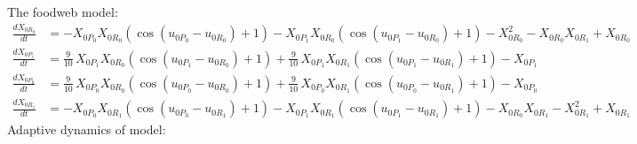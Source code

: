 \documentclass{article}
\begin{document}
The foodweb model:
\[\begin{align*}
\frac{dX_{0R_{0}}}{dt} &= -X_{0P_{0}} X_{0R_{0}} {\left(\cos\left(u_{0P_{0}} - u_{0R_{0}}\right) + 1\right)} - X_{0P_{1}} X_{0R_{0}} {\left(\cos\left(u_{0P_{1}} - u_{0R_{0}}\right) + 1\right)} - X_{0R_{0}}^{2} - X_{0R_{0}} X_{0R_{1}} + X_{0R_{0}}\\
\frac{dX_{0P_{1}}}{dt} &= \frac{9}{10} \, X_{0P_{1}} X_{0R_{0}} {\left(\cos\left(u_{0P_{1}} - u_{0R_{0}}\right) + 1\right)} + \frac{9}{10} \, X_{0P_{1}} X_{0R_{1}} {\left(\cos\left(u_{0P_{1}} - u_{0R_{1}}\right) + 1\right)} - X_{0P_{1}}\\
\frac{dX_{0P_{0}}}{dt} &= \frac{9}{10} \, X_{0P_{0}} X_{0R_{0}} {\left(\cos\left(u_{0P_{0}} - u_{0R_{0}}\right) + 1\right)} + \frac{9}{10} \, X_{0P_{0}} X_{0R_{1}} {\left(\cos\left(u_{0P_{0}} - u_{0R_{1}}\right) + 1\right)} - X_{0P_{0}}\\
\frac{dX_{0R_{1}}}{dt} &= -X_{0P_{0}} X_{0R_{1}} {\left(\cos\left(u_{0P_{0}} - u_{0R_{1}}\right) + 1\right)} - X_{0P_{1}} X_{0R_{1}} {\left(\cos\left(u_{0P_{1}} - u_{0R_{1}}\right) + 1\right)} - X_{0R_{0}} X_{0R_{1}} - X_{0R_{1}}^{2} + X_{0R_{1}}
\end{align*}\]
Adaptive dynamics of model:
\end{document}
